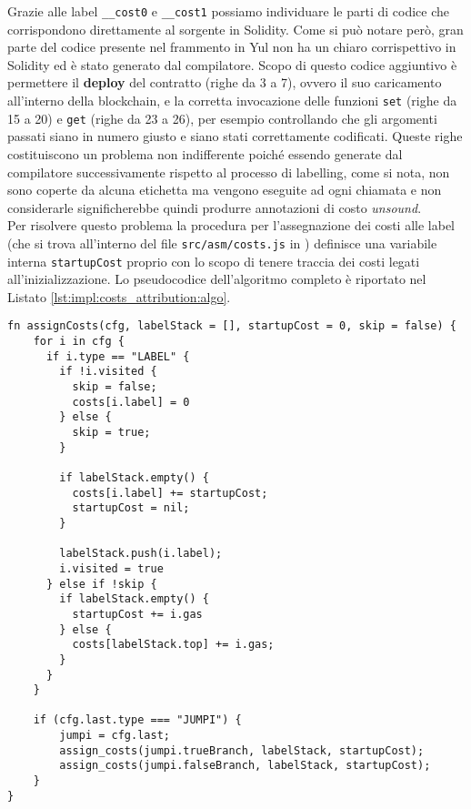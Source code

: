 \documentclass[12pt,a4paper,openright,oneside]{report}
\theoremstyle{definition}
\begin{document}
Grazie alle label \texttt{\_\_cost0} e \texttt{\_\_cost1} possiamo individuare le parti di codice che corrispondono direttamente al sorgente in Solidity. Come si pu\`{o} notare per\`{o}, gran parte del codice presente nel frammento in Yul non ha un chiaro corrispettivo in Solidity ed \`{e} stato generato dal compilatore. Scopo di questo codice aggiuntivo \`{e} permettere il \textbf{deploy} del contratto (righe da 3 a 7), ovvero il suo caricamento all'interno della blockchain, e la corretta invocazione delle funzioni \texttt{set} (righe da 15 a 20) e \texttt{get} (righe da 23 a 26), per esempio controllando che gli argomenti passati siano in numero giusto e siano stati correttamente codificati. Queste righe costituiscono un problema non indifferente poich\'{e} essendo generate dal compilatore successivamente rispetto al processo di labelling, come si nota, non sono coperte da alcuna etichetta ma vengono eseguite ad ogni chiamata e non considerarle significherebbe quindi produrre annotazioni di costo \textit{unsound}.\\
Per risolvere questo problema la procedura per l'assegnazione dei costi alle label (che si trova all'interno del file \texttt{src/asm/costs.js} in \cite{repo_thesis}) definisce una variabile interna \texttt{startupCost} proprio con lo scopo di tenere traccia dei costi legati all'inizializzazione. Lo pseudocodice dell'algoritmo completo \`{e} riportato nel Listato \ref{lst:impl:costs_attribution:algo}.
\begin{lstlisting}[caption=Pseudocodice dell'algoritmo per l'assegnazione dei costi alle etichette,label={lst:impl:costs_attribution:algo},frame=tlrb]
fn assignCosts(cfg, labelStack = [], startupCost = 0, skip = false) {
    for i in cfg {
      if i.type == "LABEL" {
        if !i.visited {
          skip = false;
          costs[i.label] = 0
        } else {
          skip = true;
        }

        if labelStack.empty() {
          costs[i.label] += startupCost;
          startupCost = nil;
        }

        labelStack.push(i.label);
        i.visited = true
      } else if !skip {
        if labelStack.empty() {
          startupCost += i.gas
        } else {
          costs[labelStack.top] += i.gas;
        }
      }
    }

    if (cfg.last.type === "JUMPI") {
        jumpi = cfg.last;
        assign_costs(jumpi.trueBranch, labelStack, startupCost);
        assign_costs(jumpi.falseBranch, labelStack, startupCost);
    }
}
\end{lstlisting}
\end{document}
